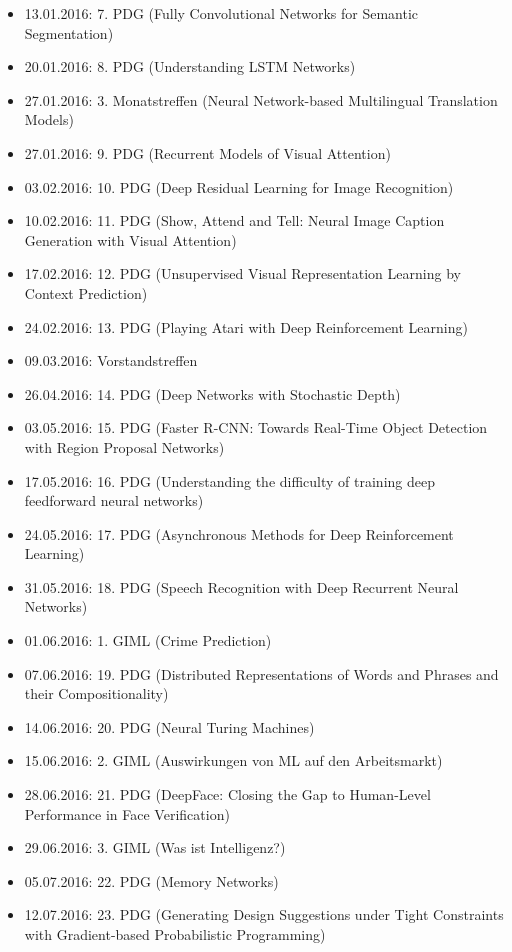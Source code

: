\documentclass[a4paper]{scrartcl}
\begin{document}
\begin{itemize}
    \item 13.01.2016: 7. PDG (Fully Convolutional Networks for Semantic Segmentation)
    \item 20.01.2016: 8. PDG (Understanding LSTM Networks)
    \item 27.01.2016: 3. Monatstreffen (Neural Network-based Multilingual Translation Models)
    \item 27.01.2016: 9. PDG (Recurrent Models of Visual Attention)
    \item 03.02.2016: 10. PDG (Deep Residual Learning for Image Recognition)
    \item 10.02.2016: 11. PDG (Show, Attend and Tell: Neural Image Caption Generation with Visual Attention)
    \item 17.02.2016: 12. PDG (Unsupervised Visual Representation Learning by Context Prediction)
    \item 24.02.2016: 13. PDG (Playing Atari with Deep Reinforcement Learning)
    \item 09.03.2016: Vorstandstreffen
    \item 26.04.2016: 14. PDG (Deep Networks with Stochastic Depth)
    \item 03.05.2016: 15. PDG (Faster R-CNN: Towards Real-Time Object Detection with Region Proposal Networks)
    \item 17.05.2016: 16. PDG (Understanding the difficulty of training deep feedforward neural networks)
    \item 24.05.2016: 17. PDG (Asynchronous Methods for Deep Reinforcement Learning)
    \item 31.05.2016: 18. PDG (Speech Recognition with Deep Recurrent Neural Networks)
    \item 01.06.2016: 1. GIML (Crime Prediction)
    \item 07.06.2016: 19. PDG (Distributed Representations of Words and Phrases and their Compositionality)
    \item 14.06.2016: 20. PDG (Neural Turing Machines)
    \item 15.06.2016: 2. GIML (Auswirkungen von ML auf den Arbeitsmarkt)
    \item 28.06.2016: 21. PDG (DeepFace: Closing the Gap to Human-Level Performance in Face Verification)
    \item 29.06.2016: 3. GIML (Was ist Intelligenz?)
    \item 05.07.2016: 22. PDG (Memory Networks)
    \item 12.07.2016: 23. PDG (Generating Design Suggestions under Tight Constraints with Gradient-based Probabilistic Programming)

\end{itemize}
\end{document}
